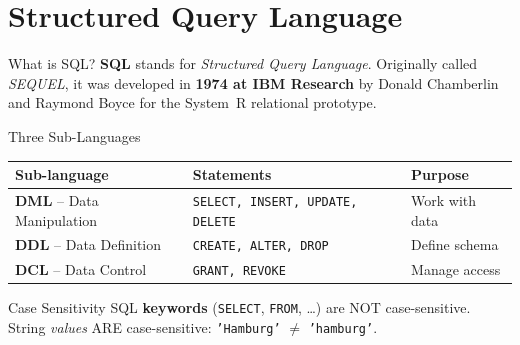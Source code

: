 
\section{Structured Query Language}

\begin{frame}{What is SQL?}
  \textbf{SQL} stands for \emph{Structured Query Language}. Originally called
  \emph{SEQUEL}, it was developed in \textbf{1974 at IBM Research} by Donald
  Chamberlin and Raymond Boyce for the System~R relational prototype.

  \begin{block}{Three Sub-Languages}
    \begin{tabular}{@{}lll@{}}
      \toprule
      \textbf{Sub-language} & \textbf{Statements} & \textbf{Purpose} \\
      \midrule
      \textbf{DML} -- Data Manipulation & \texttt{SELECT, INSERT, UPDATE, DELETE} & Work with data \\
      \textbf{DDL} -- Data Definition   & \texttt{CREATE, ALTER, DROP}            & Define schema \\
      \textbf{DCL} -- Data Control      & \texttt{GRANT, REVOKE}                  & Manage access \\
      \bottomrule
    \end{tabular}
  \end{block}

  \begin{alertblock}{Case Sensitivity}
    SQL \textbf{keywords} (\texttt{SELECT}, \texttt{FROM}, \ldots) are NOT case-sensitive.
    String \emph{values} ARE case-sensitive: \texttt{'Hamburg'} $\neq$ \texttt{'hamburg'}.
  \end{alertblock}
\end{frame}

